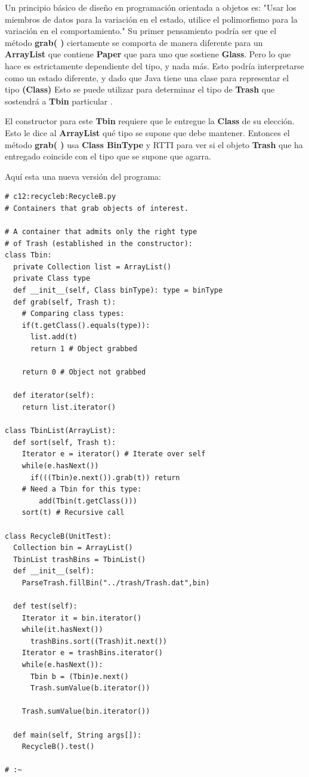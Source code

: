 \documentclass{article}
\begin{document}
Un principio básico de diseño en programación orientada a objetos es: "Usar los miembros de datos para la variación en el estado, utilice el polimorfismo para la variación en el comportamiento." Su primer pensamiento podría ser que el método \textbf{grab( )} ciertamente se comporta de manera diferente para un \textbf{ArrayList} que contiene \textbf{Paper} que para uno que sostiene \textbf{Glass}. Pero lo que hace es estrictamente dependiente del tipo, y nada más. Esto podría interpretarse como un estado diferente, y dado que Java tiene una clase para representar el tipo \textbf{(Class)} Esto se puede utilizar para determinar el tipo de \textbf{Trash} que sostendrá a \textbf{Tbin} particular .       \newline

El constructor para este \textbf{Tbin } requiere que le entregue la \textbf{Class} de su elección. Esto le dice al \textbf{ArrayList} qué tipo se supone que debe mantener. Entonces el método \textbf{grab( )} usa \textbf{Class BinType} y RTTI para ver si el objeto \textbf{Trash} que ha entregado coincide con el tipo que se supone que agarra.      \newline

Aquí esta una nueva versión del programa:       \newline

\begin{lstlisting} 
# c12:recycleb:RecycleB.py 
# Containers that grab objects of interest. 

# A container that admits only the right type 
# of Trash (established in the constructor): 
class Tbin: 
  private Collection list = ArrayList() 
  private Class type 
  def __init__(self, Class binType): type = binType  
  def grab(self, Trash t): 
    # Comparing class types: 
    if(t.getClass().equals(type)): 
      list.add(t) 
      return 1 # Object grabbed 
      
    return 0 # Object not grabbed  
    
  def iterator(self): 
    return list.iterator() 
    
class TbinList(ArrayList): 
  def sort(self, Trash t): 
    Iterator e = iterator() # Iterate over self 
    while(e.hasNext()) 
      if(((Tbin)e.next()).grab(t)) return 
    # Need a Tbin for this type: 
        add(Tbin(t.getClass())) 
    sort(t) # Recursive call 
    
class RecycleB(UnitTest): 
  Collection bin = ArrayList() 
  TbinList trashBins = TbinList() 
  def __init__(self): 
    ParseTrash.fillBin("../trash/Trash.dat",bin) 
    
  def test(self): 
    Iterator it = bin.iterator() 
    while(it.hasNext()) 
      trashBins.sort((Trash)it.next()) 
    Iterator e = trashBins.iterator() 
    while(e.hasNext()): 
      Tbin b = (Tbin)e.next() 
      Trash.sumValue(b.iterator()) 
      
    Trash.sumValue(bin.iterator()) 
    
  def main(self, String args[]): 
    RecycleB().test() 
    
# :~ 
\end{lstlisting}
\end{document}
